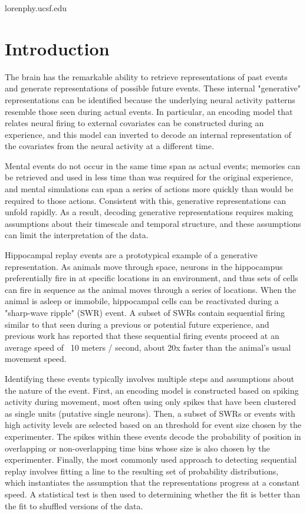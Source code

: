 \documentclass[times, twoside]{zHenriquesLab-StyleBioRxiv}
\begin{document}
\begin{corrauthor}
loren\at phy.ucsf.edu
\end{corrauthor}

\section*{Introduction}
The brain has the remarkable ability to retrieve representations of past events and generate representations of possible future events. These internal "generative" representations can be identified because the underlying neural activity patterns resemble those seen during actual events. In particular, an encoding model that relates neural firing to external covariates can be constructed during an experience, and this model can inverted to decode an internal representation of the covariates from the neural activity at a different time.

Mental events do not occur in the same time span as actual events; memories can be retrieved and used in less time than was required for the original experience, and mental simulations can span a series of actions more quickly than would be required to those actions. Consistent with this, generative representations can unfold rapidly. As a result, decoding generative representations requires making assumptions about their timescale and temporal structure, and these assumptions can limit the interpretation of the data. 

Hippocampal replay events are a prototypical example of a generative representation. As animals move through space, neurons in the hippocampus preferentially fire in at specific locations in an environment, and thus sets of cells can fire in sequence as the animal moves through a series of locations. When the animal is asleep or immobile, hippocampal cells can be reactivated during a "sharp-wave ripple" (SWR) event. A subset of SWRs contain sequential firing similar to that seen during a previous or potential future experience, and previous work has reported that these sequential firing events proceed at an average speed of ~10 meters / second, about 20x faster than the animal's usual movement speed. 

Identifying these events typically involves multiple steps and assumptions about the nature of the event. First, an encoding model is constructed based on spiking activity during movement, most often using only spikes that have been clustered as single units (putative single neurons). Then, a subset of SWRs or events with high activity levels are selected based on an threshold for event size chosen by the experimenter. The spikes within these events decode the probability of position in overlapping or non-overlapping time bins whose size is also chosen by the experimenter. Finally, the most commonly used approach to detecting sequential replay involves fitting a line to the resulting set of probability distributions, which instantiates the assumption that the representations progress at a constant speed. A statistical test is then used to determining whether the fit is better than the fit to shuffled versions of the data.
\end{document}
